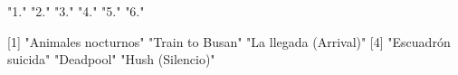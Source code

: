 \begin{Schunk}
\begin{Soutput}
[1] "1." "2." "3." "4." "5." "6."

[1] "Animales nocturnos"   "Train to Busan"       "La llegada (Arrival)"
[4] "Escuadrón suicida"    "Deadpool"             "Hush (Silencio)"     
\end{Soutput}
\end{Schunk}
